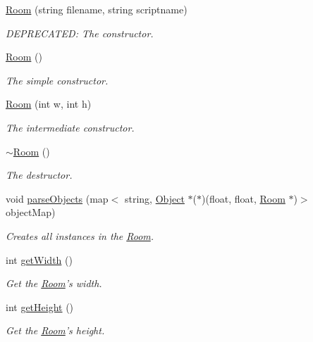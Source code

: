 \begin{DoxyCompactItemize}
\item 
\hyperlink{class_room_a5fd7380ec44c3e7c4c85cde194c8c4c5}{Room} (string filename, string scriptname)
\begin{DoxyCompactList}\small\item\em D\-E\-P\-R\-E\-C\-A\-T\-E\-D\-: The constructor. \end{DoxyCompactList}\item 
\hyperlink{class_room_ac6ef93a7d9c3e1d624e025058d5f16ff}{Room} ()
\begin{DoxyCompactList}\small\item\em The simple constructor. \end{DoxyCompactList}\item 
\hyperlink{class_room_aec8c6468cfa356445e072430df3ed73b}{Room} (int w, int h)
\begin{DoxyCompactList}\small\item\em The intermediate constructor. \end{DoxyCompactList}\item 
\hyperlink{class_room_a67d5da09983cc53097807fd43ba5481a}{$\sim$\-Room} ()
\begin{DoxyCompactList}\small\item\em The destructor. \end{DoxyCompactList}\item 
void \hyperlink{class_room_ae996c7c2c5dcecd0e92b62d631978a89}{parse\-Objects} (map$<$ string, \hyperlink{class_object}{Object} $\ast$($\ast$)(float, float, \hyperlink{class_room}{Room} $\ast$)$>$ object\-Map)
\begin{DoxyCompactList}\small\item\em Creates all instances in the \hyperlink{class_room}{Room}. \end{DoxyCompactList}\item 
int \hyperlink{class_room_a297c938f6a2e911b6ae846e795d6d05e}{get\-Width} ()
\begin{DoxyCompactList}\small\item\em Get the \hyperlink{class_room}{Room}'s width. \end{DoxyCompactList}\item 
int \hyperlink{class_room_acbc864ff80ab5e2782a9bbcf78377e06}{get\-Height} ()
\begin{DoxyCompactList}\small\item\em Get the \hyperlink{class_room}{Room}'s height. \end{DoxyCompactList}\item 

\end{DoxyCompactItemize}
